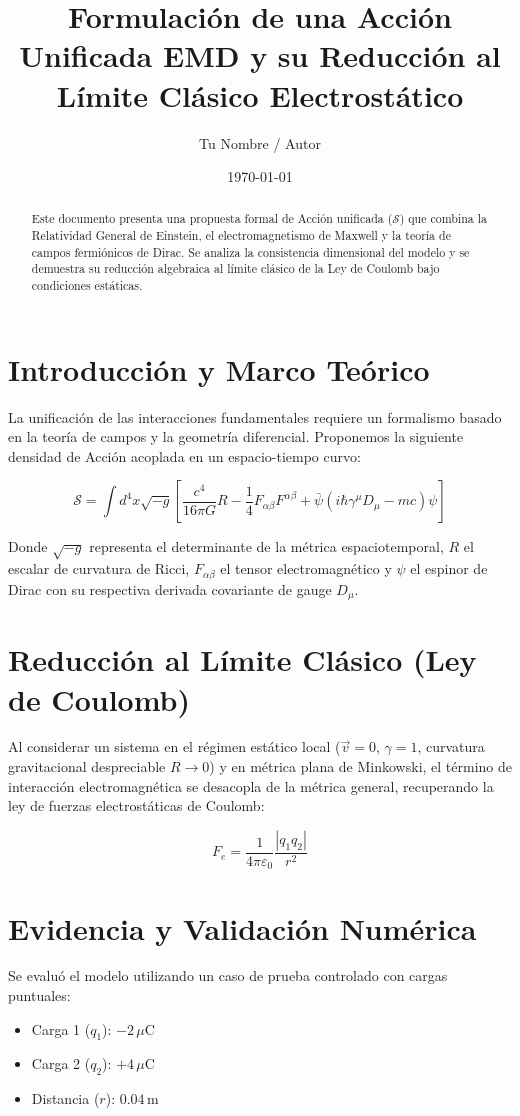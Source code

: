\documentclass[11pt,a4paper]{article}
\title{\textbf{Formulación de una Acción Unificada EMD y su Reducción al Límite Clásico Electrostático}}
\author{Tu Nombre / Autor}
\date{\today}
\begin{document}
\maketitle

\begin{abstract}
Este documento presenta una propuesta formal de Acción unificada ($\mathcal{S}$) que combina la Relatividad General de Einstein, el electromagnetismo de Maxwell y la teoría de campos fermiónicos de Dirac. Se analiza la consistencia dimensional del modelo y se demuestra su reducción algebraica al límite clásico de la Ley de Coulomb bajo condiciones estáticas.
\end{abstract}

\section{Introducción y Marco Teórico}
La unificación de las interacciones fundamentales requiere un formalismo basado en la teoría de campos y la geometría diferencial. Proponemos la siguiente densidad de Acción acoplada en un espacio-tiempo curvo:

\begin{equation}
\mathcal{S} = \int d^4x \sqrt{-g} \left[ \frac{c^4}{16\pi G} R - \frac{1}{4} F_{\alpha\beta} F^{\alpha\beta} + \bar{\psi}(i \hbar \gamma^\mu D_\mu - m c)\psi \right]
\end{equation}

Donde $\sqrt{-g}$ representa el determinante de la métrica espaciotemporal, $R$ el escalar de curvatura de Ricci, $F_{\alpha\beta}$ el tensor electromagnético y $\psi$ el espinor de Dirac con su respectiva derivada covariante de gauge $D_\mu$.

\section{Reducción al Límite Clásico (Ley de Coulomb)}
Al considerar un sistema en el régimen estático local ($\vec{v} = 0$, $\gamma = 1$, curvatura gravitacional despreciable $R \to 0$) y en métrica plana de Minkowski, el término de interacción electromagnética se desacopla de la métrica general, recuperando la ley de fuerzas electrostáticas de Coulomb:

\begin{equation}
F_e = \frac{1}{4\pi \varepsilon_0} \frac{|q_1 q_2|}{r^2}
\end{equation}

\section{Evidencia y Validación Numérica}
Se evaluó el modelo utilizando un caso de prueba controlado con cargas puntuales:
\begin{itemize}
    \item Carga 1 ($q_1$): $-2 \, \mu\text{C}$
    \item Carga 2 ($q_2$): $+4 \, \mu\text{C}$
    \item Distancia ($r$): $0.04 \, \text{m}$
\end{itemize}
\end{document}
